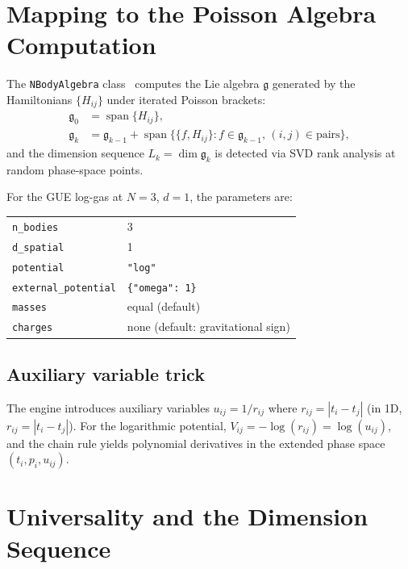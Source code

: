 \documentclass[11pt,a4paper]{article}
\begin{document}
\section{Mapping to the Poisson Algebra Computation}
\label{sec:mapping}

The \texttt{NBodyAlgebra} class~\cite{3bodyrepo} computes the Lie algebra
$\mathfrak{g}$ generated by the Hamiltonians $\{H_{ij}\}$ under iterated
Poisson brackets:
\begin{align}
  \mathfrak{g}_0 &= \operatorname{span}\{H_{ij}\}, \\
  \mathfrak{g}_k &= \mathfrak{g}_{k-1}
    + \operatorname{span}\bigl\{\{f, H_{ij}\} : f \in \mathfrak{g}_{k-1},
      \, (i,j) \in \text{pairs}\bigr\},
\end{align}
and the dimension sequence $L_k = \dim \mathfrak{g}_k$ is detected via
SVD rank analysis at random phase-space points.

For the GUE log-gas at $N = 3$, $d = 1$, the parameters are:

\begin{center}
\begin{tabular}{ll}
  \hline
  \texttt{n\_bodies} & 3 \\
  \texttt{d\_spatial} & 1 \\
  \texttt{potential} & \texttt{"log"} \\
  \texttt{external\_potential} & \texttt{\{"omega": 1\}} \\
  \texttt{masses} & equal (default) \\
  \texttt{charges} & none (default: gravitational sign) \\
  \hline
\end{tabular}
\end{center}

\subsection{Auxiliary variable trick}

The engine introduces auxiliary variables $u_{ij} = 1/r_{ij}$ where
$r_{ij} = |t_i - t_j|$ (in 1D, $r_{ij} = |t_i - t_j|$). For the
logarithmic potential, $V_{ij} = -\log(r_{ij}) = \log(u_{ij})$, and the
chain rule yields polynomial derivatives in the extended phase space
$(t_i, p_i, u_{ij})$.

\section{Universality and the Dimension Sequence}
\label{sec:universality}
\end{document}
